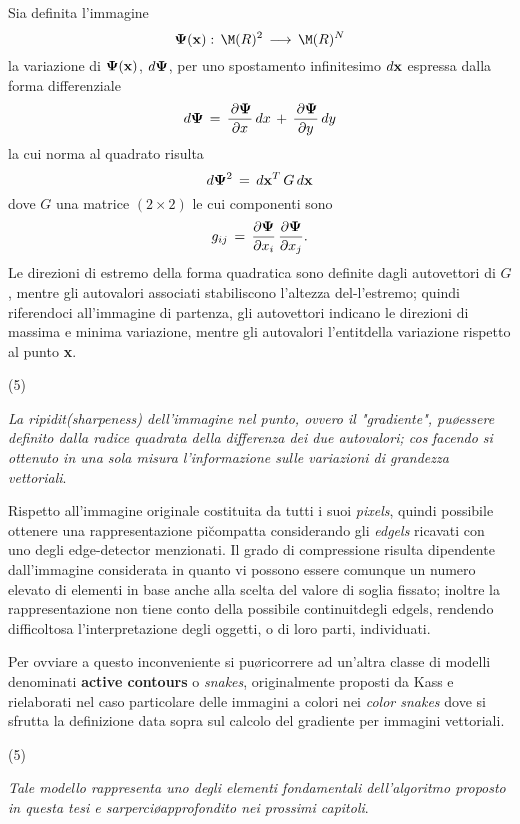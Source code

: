     Sia definita l'immagine 
    $$
    {\bf \Psi}({\bf x}):\,\M(R)^2\,\longrightarrow\,\M(R)^N
    $$
    la variazione di ${\bf \Psi}({\bf x})$, $d{\bf \Psi}$, per uno spostamento infinitesimo
    $d{\bf x}$ \e espressa dalla forma differenziale
    $$
    d{\bf \Psi}\,=\,\frac{\,\partial {\bf \Psi}}{\partial x}\,dx\,+
                  \,\frac{\,\partial {\bf \Psi}}{\partial y}\,dy
    $$
    la cui norma al quadrato risulta
    $$
    d{\bf \Psi}^2\,=\,d{\bf x}^T\,G\,d{\bf x}
    $$
    dove $G$ \e una matrice $(2 \times 2)$ le cui componenti sono 
    $$
    g_{ij}\,=\,\frac{\partial {\bf \Psi}}{\partial x_i}
             \,\frac{\partial {\bf \Psi}}{\partial x_j}.
    $$
    Le direzioni di estremo della forma quadratica sono definite dagli autovettori di $G$, 
    mentre gli autovalori associati stabiliscono l'altezza del-l'estremo; quindi
    riferendoci all'immagine di partenza, gli autovettori indicano le direzioni di massima
    e minima variazione, mentre gli autovalori l'entit\a della variazione rispetto al
    punto {\bf x}.
    
    \vs(5)
 
    {\sl La ripidit\a ({\it sharpeness}) dell'immagine nel punto, ovvero il "{\it gradiente}",
    pu\o essere definito dalla radice quadrata della differenza dei due autovalori;
    cos\iac\,\,facendo si \e ottenuto in una sola misura l'informazione sulle variazioni
    di grandezza vettoriali}.
\een

Rispetto all'immagine originale costituita da tutti i suoi {\it pixels}, \e quindi possibile
ottenere una rappresentazione pi\u compatta considerando gli {\it edgels} ricavati con
uno degli edge-detector menzionati.
Il grado di compressione risulta dipendente dall'immagine considerata in quanto
vi possono essere comunque un numero elevato di elementi in base anche alla scelta del
valore di soglia fissato; inoltre la rappresentazione non tiene conto della possibile
continuit\a degli edgels, rendendo difficoltosa l'interpretazione degli oggetti, o di
loro parti, individuati.

Per ovviare a questo inconveniente si pu\o ricorrere ad un'altra classe di modelli 
denominati {\bf active contours} o {\it snakes}, originalmente proposti da Kass \cite{Kass}
e rielaborati nel caso particolare delle immagini a colori nei {\it color snakes} \cite{Gevers}
dove si sfrutta la definizione data sopra sul calcolo del gradiente
per immagini vettoriali.

\vs(5)

{\sl Tale modello rappresenta uno degli elementi fondamentali dell'algoritmo proposto in
questa tesi e sar\a perci\o approfondito nei prossimi capitoli}.


